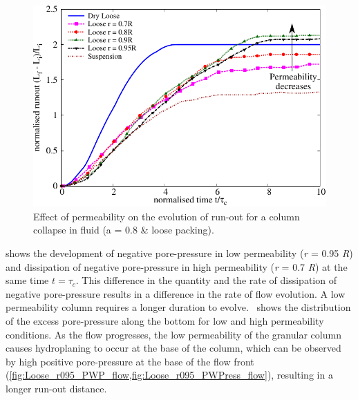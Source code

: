 \documentclass[12pt,a4paper,twocolumn,fleqn]{narms}
\begin{document}
\begin{figure}
\centering
\includegraphics[width=0.9\linewidth]{figs/Runout_a08_loose.pdf}
\caption{Effect of permeability on the evolution of run-out for a column 
collapse in fluid (a = 0.8 \& loose packing).}
\label{fig:Runout_a08_loose}
\end{figure}

 shows the development of negative pore-pressure in low 
permeability (\textit{r} = 0.95 \textit{R}) and dissipation of negative 
pore-pressure in high permeability (\textit{r} = 0.7 \textit{R}) at the same 
time $ t = \tau_c$. This difference in the quantity and the rate of dissipation 
of negative pore-pressure results in a difference in the rate of flow 
evolution. A low permeability column requires a longer duration to 
evolve.~ shows the distribution of the excess 
pore-pressure along the bottom for low and high permeability conditions. As the 
flow progresses, the low permeability of the granular column causes 
hydroplaning to occur at the base of the column, which can be observed by high 
positive pore-pressure at the base of the flow front 
(\cref{fig:Loose_r095_PWP_flow,fig:Loose_r095_PWPress_flow}), resulting in a 
longer run-out distance.
\end{document}
